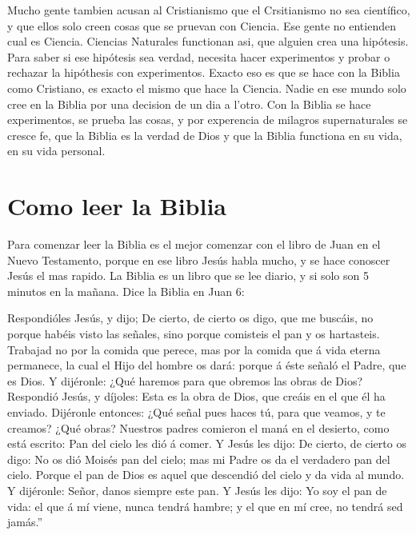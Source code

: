 Mucho gente tambien acusan al Cristianismo que el Crsitianismo no sea
científico, y que ellos solo creen cosas que se pruevan con Ciencia. Ese
gente no entienden cual es Ciencia. Ciencias Naturales functionan asi,
que alguien crea una hipótesis. Para saber si ese hipótesis sea verdad,
necesita hacer experimentos y probar o rechazar la hipóthesis con
experimentos. Exacto eso es que se hace con la Biblia como Cristiano, es
exacto el mismo que hace la Ciencia. Nadie en ese mundo solo cree en la
Biblia por una decision de un dia a l'otro. Con la Biblia se hace
experimentos, se prueba las cosas, y por experencia de milagros
supernaturales se cresce fe, que la Biblia es la verdad de Dios y que la
Biblia functiona en su vida, en su vida personal.

\hypertarget{como-leer-la-biblia}{%
\section{Como leer la Biblia}\label{como-leer-la-biblia}}

Para comenzar leer la Biblia es el mejor comenzar con el libro de Juan
en el Nuevo Testamento, porque en ese libro Jesús habla mucho, y se hace
conoscer Jesús el mas rapido. La Biblia es un libro que se lee diario, y
si solo son 5 minutos en la mañana. Dice la Biblia en Juan 6:

 Respondióles Jesús, y dijo; De cierto, de cierto os digo,
que me buscáis, no porque habéis visto las señales, sino porque
comisteis el pan y os hartasteis.  Trabajad no por la
comida que perece, mas por la comida que á vida eterna permanece, la
cual el Hijo del hombre os dará: porque á éste señaló el Padre, que es
Dios.  Y dijéronle: ¿Qué haremos para que obremos las obras
de Dios?  Respondió Jesús, y díjoles: Esta es la obra de
Dios, que creáis en el que él ha enviado.  Dijéronle
entonces: ¿Qué señal pues haces tú, para que veamos, y te creamos? ¿Qué
obras?  Nuestros padres comieron el maná en el desierto,
como está escrito: Pan del cielo les dió á comer.  Y Jesús
les dijo: De cierto, de cierto os digo: No os dió Moisés pan del cielo;
mas mi Padre os da el verdadero pan del cielo.  Porque el
pan de Dios es aquel que descendió del cielo y da vida al mundo.
 Y dijéronle: Señor, danos siempre este pan. 
Y Jesús les dijo: Yo soy el pan de vida: el que á mí viene, nunca tendrá
hambre; y el que en mí cree, no tendrá sed jamás.''

